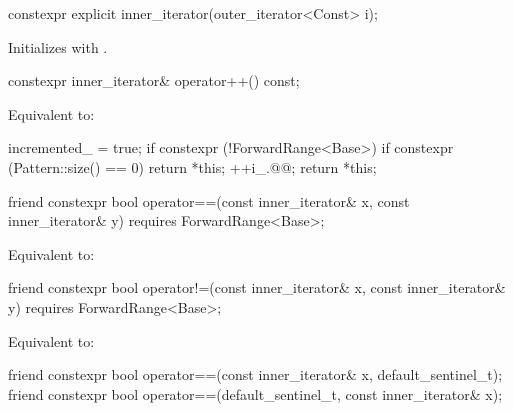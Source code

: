 %
\begin{itemdecl}
constexpr explicit inner_iterator(outer_iterator<Const> i);
\end{itemdecl}

\begin{itemdescr}
\pnum
\effects Initializes  with .
\end{itemdescr}

%
\begin{itemdecl}
constexpr inner_iterator& operator++() const;
\end{itemdecl}

\begin{itemdescr}
\pnum
\effects Equivalent to:
\begin{codeblock}
incremented_ = true;
if constexpr (!ForwardRange<Base>) {
  if constexpr (Pattern::size() == 0) {
    return *this;
  }
}
++i_.@@;
return *this;
\end{codeblock}
\end{itemdescr}

%
\begin{itemdecl}
friend constexpr bool operator==(const inner_iterator& x, const inner_iterator& y)
  requires ForwardRange<Base>;
\end{itemdecl}

\begin{itemdescr}
\pnum
\effects Equivalent to: 
\end{itemdescr}

%
\begin{itemdecl}
friend constexpr bool operator!=(const inner_iterator& x, const inner_iterator& y)
  requires ForwardRange<Base>;
\end{itemdecl}

\begin{itemdescr}
\pnum
\effects Equivalent to: 
\end{itemdescr}

%
\begin{itemdecl}
friend constexpr bool operator==(const inner_iterator& x, default_sentinel_t);
friend constexpr bool operator==(default_sentinel_t, const inner_iterator& x);
\end{itemdecl}

